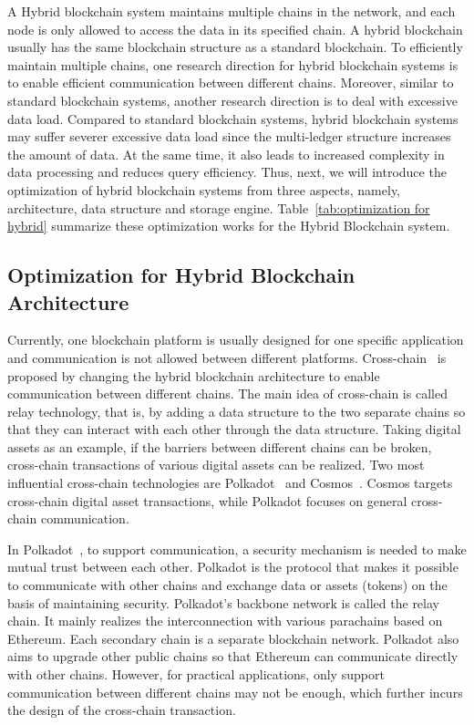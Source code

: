 \documentclass[acmsmall]{acmart}
\begin{document}
A Hybrid blockchain system maintains multiple chains in the network, and each node is only allowed to access the data in its specified chain. A hybrid blockchain usually has the same blockchain structure as a standard blockchain. To efficiently maintain multiple chains, one research direction for hybrid blockchain systems is to enable efficient communication between different chains. Moreover, similar to standard blockchain systems, another research direction is to deal with excessive data load. Compared to standard blockchain systems, hybrid blockchain systems may suffer severer excessive data load since the multi-ledger structure increases the amount of data. At the same time, it also leads to increased complexity in data processing and reduces query efficiency. Thus, next, we will introduce the optimization of hybrid blockchain systems from three aspects, namely, architecture, data structure and storage engine. Table~\ref{tab:optimization for hybrid} summarize these optimization works for the Hybrid Blockchain system.

\subsection{Optimization for Hybrid Blockchain Architecture}

Currently, one blockchain platform is usually designed for one specific application and communication is not allowed between different platforms. Cross-chain~\cite{herlihy2018atomic} is proposed by changing the hybrid blockchain architecture to enable communication between different chains. The main idea of cross-chain is called relay technology, that is, by adding a data structure to the two separate chains so that they can interact with each other through the data structure. Taking digital assets as an example, if the barriers between different chains can be broken, cross-chain transactions of various digital assets can be realized. Two most influential cross-chain technologies are Polkadot~\cite{wood2016polkadot} and Cosmos~\cite{kwon2016cosmos}.  Cosmos targets cross-chain digital asset transactions, while Polkadot focuses on general cross-chain communication.



In Polkadot~\cite{wood2016polkadot}, to support communication, a security mechanism is needed to make mutual trust between each other. Polkadot is the protocol that makes it possible to communicate with other chains and exchange data or assets (tokens) on the basis of maintaining security. Polkadot's backbone network is called the relay chain. It mainly realizes the interconnection with various parachains based on Ethereum. Each secondary chain is a separate blockchain network. Polkadot also aims to upgrade other public chains so that Ethereum can communicate directly with other chains. 
However, for practical applications, only support communication between different chains may not be enough, which further incurs the design of the cross-chain transaction.
\end{document}
